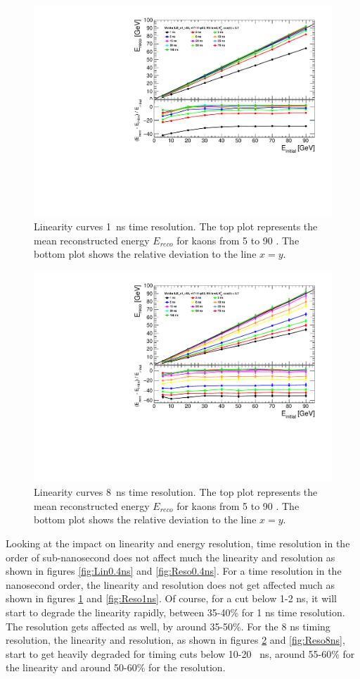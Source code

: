 \begin{figure}[htbp!]
  \centering
  \includegraphics[width=0.7\linewidth]{../Thesis_Plots/ILD/Smearing_1ns/Plots/Linearity_TimeCuts_Smearing2}
  \caption{Linearity curves \SI{1}{\nano\second} time resolution. The top plot represents the mean reconstructed energy $E_{reco}$ for kaons from 5 to 90 \GeV. The bottom plot shows the relative deviation to the line $x=y$.} \label{fig:Lin1ns}
\end{figure}

\begin{figure}[htbp!]
  \centering
  \includegraphics[width=0.7\linewidth]{../Thesis_Plots/ILD/Smearing_8ns/Plots/Linearity_TimeCuts_Smearing3}
  \caption{Linearity curves \SI{8}{\nano\second} time resolution. The top plot represents the mean reconstructed energy $E_{reco}$ for kaons from 5 to 90 \GeV. The bottom plot shows the relative deviation to the line $x=y$.}  \label{fig:Lin8ns}
\end{figure}

Looking at the impact on linearity and energy resolution, time resolution in the order of sub-nanosecond does not affect much the linearity and resolution as shown in figures \ref{fig:Lin0.4ns} and \ref{fig:Reso0.4ns}. For a time resolution in the nanosecond order, the linearity and resolution does not get affected much as shown in figures \ref{fig:Lin1ns} and \ref{fig:Reso1ns}. Of course, for a cut below 1-2 ns, it will start to degrade the linearity rapidly, between 35-40\% for 1 ns time resolution. The resolution gets affected as well, by around 35-50\%. For the 8 ns timing resolution, the linearity and resolution, as shown in figures \ref{fig:Lin8ns} and \ref{fig:Reso8ns}, start to get heavily degraded for timing cuts below 10-20 \SI{}{\nano\second}, around 55-60\% for the linearity and around 50-60\% for the resolution.

